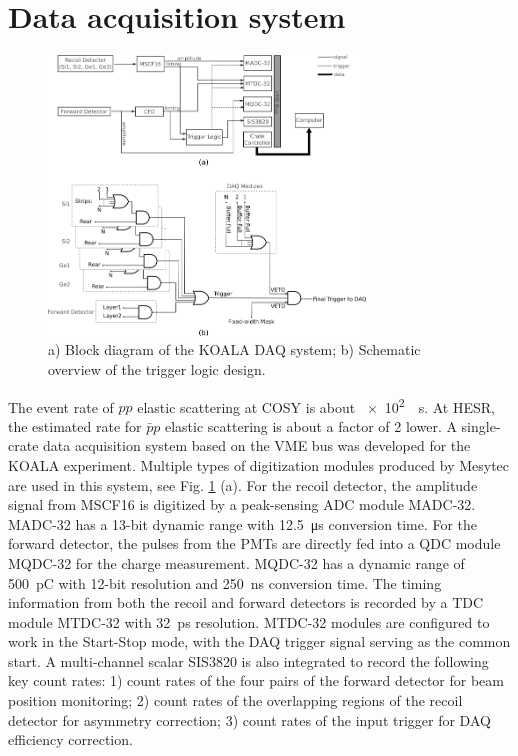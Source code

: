 \documentclass[number,5p]{elsarticle}
\begin{document}
\section{Data acquisition system}
\label{sec:daq}
\begin{figure}[bt]
  \centering
  \includegraphics[width=0.75\textwidth]{./daq_scheme.png}
  \caption{a) Block diagram of the KOALA DAQ system; b) Schematic overview of
    the trigger logic design.}
  \label{fig:trigger_logic}
\end{figure}
The event rate of $pp$ elastic scattering at COSY is about \SI[per-mode=power]{e2}{\per\second}.
At HESR, the estimated rate for $\bar{p}p$ elastic scattering is about a factor of 2 lower.
A single-crate data acquisition system based on the VME bus was developed for the KOALA experiment.
Multiple types of digitization modules produced by Mesytec \cite{mesytec} are
used in this system, see Fig. \ref{fig:trigger_logic} (a).
For the recoil detector, the amplitude signal from MSCF16 is digitized by a
peak-sensing ADC module MADC-32.
MADC-32 has a 13-bit dynamic range with \SI{12.5}{\micro\second} conversion time.
For the forward detector, the pulses from the PMTs are directly fed into a QDC
module MQDC-32 for the charge measurement.
MQDC-32 has a dynamic range of \SI{500}{\pico\coulomb} with 12-bit resolution
and \SI{250}{\nano\second} conversion time.
The timing information from both the recoil and forward detectors is recorded
by a TDC module MTDC-32 with \SI{32}{\pico\second} resolution.
MTDC-32 modules are configured to work in the Start-Stop mode, with the DAQ
trigger signal serving as the common start.
A multi-channel scalar SIS3820 \cite{sis} is also integrated to record
the following key count rates: 1) count rates of the four pairs of the forward detector for beam position monitoring; 2) count rates of the overlapping regions of the recoil detector for asymmetry correction; 3) count rates of the input trigger for DAQ efficiency correction.
\end{document}
